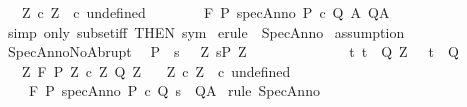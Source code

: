 \begin{isabellebody}
\ \ \ {\isasymforall}Z{\isachardot}\ c\ Z\ {\isacharequal}\ c\ undefined\isanewline
\ \ {\isasymrbrakk}\ {\isasymLongrightarrow}\isanewline
\ \ \ \ {\isasymGamma}{\isacharcomma}{\isasymTheta}{\isasymturnstile}\isactrlbsub {\isacharslash}F\isactrlesub \ P\ {\isacharparenleft}specAnno\ P{\isacharprime}\ c\ Q{\isacharprime}\ A{\isacharprime}{\isacharparenright}\ Q{\isacharcomma}A{\isachardoublequoteclose}\isanewline
%
\isadelimproof
%
\endisadelimproof
%
\isatagproof
{}\isamarkupfalse%
\ {\isacharparenleft}simp\ only{\isacharcolon}\ subset{\isacharunderscore}iff\ {\isacharbrackleft}THEN\ sym{\isacharbrackright}{\isacharparenright}\isanewline
{}\isamarkupfalse%
\ {\isacharparenleft}erule\ {\isacharparenleft}{}{\isacharparenright}\ SpecAnno{\isacharparenright}\isanewline
{}\isamarkupfalse%
\ assumption\isanewline
{}\isamarkupfalse%
%
\endisatagproof
{\isafoldproof}%
%
\isadelimproof
\isanewline
%
\endisadelimproof
\isanewline
\isanewline
{}\isamarkupfalse%
\ SpecAnnoNoAbrupt{\isacharcolon}\ \isanewline
\ {\isachardoublequoteopen}{\isasymlbrakk}P\ {\isasymsubseteq}\ {\isacharbraceleft}s{\isachardot}\ \ {\isasymexists}\ Z{\isachardot}\ s{\isasymin}P{\isacharprime}\ Z\ {\isasymand}\ \isanewline
\ \ \ \ \ \ \ \ \ \ \ \ {\isacharparenleft}{\isasymforall}t{\isachardot}\ t\ {\isasymin}\ Q{\isacharprime}\ Z\ {\isasymlongrightarrow}\ \ t\ {\isasymin}\ Q{\isacharparenright}{\isacharbraceright}{\isacharsemicolon}\isanewline
\ \ \ {\isasymforall}Z{\isachardot}\ {\isasymGamma}{\isacharcomma}{\isasymTheta}{\isasymturnstile}\isactrlbsub {\isacharslash}F\isactrlesub \ {\isacharparenleft}P{\isacharprime}\ Z{\isacharparenright}\ {\isacharparenleft}c\ Z{\isacharparenright}\ {\isacharparenleft}Q{\isacharprime}\ Z{\isacharparenright}{\isacharcomma}{\isacharbraceleft}{\isacharbraceright}{\isacharsemicolon}\isanewline
\ \ \ {\isasymforall}Z{\isachardot}\ c\ Z\ {\isacharequal}\ c\ undefined\isanewline
\ \ {\isasymrbrakk}\ {\isasymLongrightarrow}\isanewline
\ \ \ \ {\isasymGamma}{\isacharcomma}{\isasymTheta}{\isasymturnstile}\isactrlbsub {\isacharslash}F\isactrlesub \ P\ {\isacharparenleft}specAnno\ P{\isacharprime}\ c\ Q{\isacharprime}\ {\isacharparenleft}{\isasymlambda}s{\isachardot}\ {\isacharbraceleft}{\isacharbraceright}{\isacharparenright}{\isacharparenright}\ Q{\isacharcomma}A{\isachardoublequoteclose}\isanewline
%
\isadelimproof
%
\endisadelimproof
%
\isatagproof
{}\isamarkupfalse%
\ {\isacharparenleft}rule\ SpecAnno{\isacharprime}{\isacharparenright}\isanewline
{}\isamarkupfalse%

\end{isabellebody}
